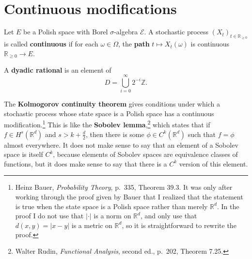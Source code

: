\documentclass{article}
\theoremstyle{definition}
\begin{document}
\section{Continuous modifications}
Let $E$ be a Polish space with Borel $\sigma$-algebra $\mathscr{E}$. 
A stochastic process $(X_t)_{t \in \mathbb{R}_{\geq 0}}$ is called \textbf{continuous} if for each $\omega \in \Omega$, the \textbf{path}
$t \mapsto X_t(\omega)$ is continuous $\mathbb{R}_{\geq 0} \to E$. 

A \textbf{dyadic rational} is an element of
\[
D=\bigcup_{i=0}^\infty 2^{-i} \mathbb{Z}.
\]


The \textbf{Kolmogorov continuity theorem} gives conditions under which a stochastic process whose state space is a Polish space 
has a continuous modification.\footnote{Heinz
Bauer, {\em Probability Theory}, p.~335, Theorem 39.3. It was only after working through the proof given by Bauer that I realized that the statement is true when the state space is a Polish space rather than merely $\mathbb{R}^d$. In the proof I do not use that $|\cdot|$ is a norm on $\mathbb{R}^d$, and only use that $d(x,y)=|x-y|$ is a metric on $\mathbb{R}^d$,
so it is straightforward to rewrite the proof.}
This is like the \textbf{Sobolev lemma},\footnote{Walter Rudin, {\em Functional Analysis}, second ed.,
p.~202, Theorem 7.25.} which states that if
$f \in H^s(\mathbb{R}^d)$ and
$s>k+\frac{d}{2}$, then there is some $\phi \in C^k(\mathbb{R}^d)$
such that $f=\phi$ almost everywhere. It does not make sense to say that an element of a Sobolev space is itself $C^k$, because elements of
Sobolev
spaces are equivalence classes of functions, but it does make sense to say that there is a $C^k$ version of this element.
\end{document}
